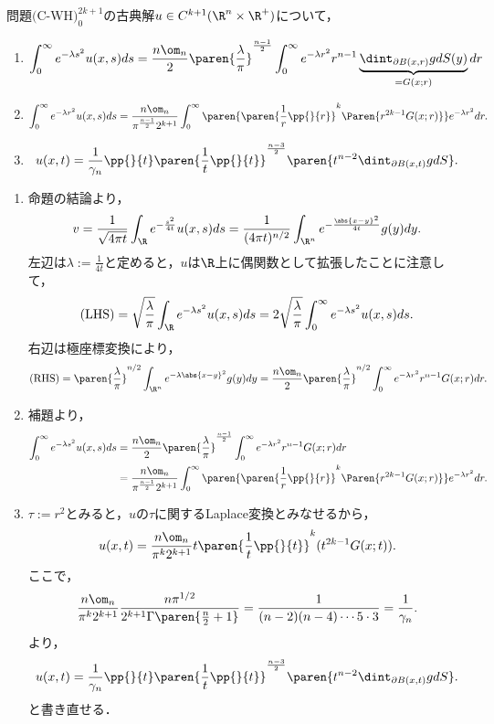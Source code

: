 \documentclass[uplatex,dvipdfmx]{jsreport}
\begin{document}
\begin{proposition}
    問題$\text{(C-WH)}^{2k+1}_0$の古典解$u\in C^{k+1}(\R^n\times\R^+)$について，
    \begin{enumerate}
        \item \[\int_0^\infty e^{-\lambda s^2}u(x,s)ds=\frac{n\om_n}{2}\paren{\frac{\lambda}{\pi}}^{\frac{n-1}{2}}\int^\infty_0e^{-\lambda r^2}r^{n-1}\underbrace{\dint_{\partial B(x,r)}gdS(y)}_{=G(x;r)}dr\]
        \item \[\int^\infty_0e^{-\lambda r^2}u(x,s)ds=\frac{n\om_n}{\pi^{\frac{n-1}{2}}2^{k+1}}\int^\infty_0\paren{\paren{\frac{1}{r}\pp{}{r}}^k\Paren{r^{2k-1}G(x;r)}}e^{-\lambda r^2}dr.\]
        \item \[u(x,t)=\frac{1}{\gamma_n}\pp{}{t}\paren{\frac{1}{t}\pp{}{t}}^{\frac{n-3}{2}}\paren{t^{n-2}\dint_{\partial B(x,t)}gdS}.\]
    \end{enumerate}
\end{proposition}
\begin{Proof}\mbox{}
    \begin{enumerate}
        \item 命題の結論より，
        \[v=\frac{1}{\sqrt{4\pi t}}\int_{\R}e^{-\frac{s^2}{4t}}u(x,s)ds=\frac{1}{(4\pi t)^{n/2}}\int_{\R^n}e^{-\frac{\abs{x-y}^2}{4t}}g(y)dy.\]
        左辺は$\lambda:=\frac{1}{4t}$と定めると，$u$は$\R$上に偶関数として拡張したことに注意して，
        \[\text{(LHS)}=\sqrt{\frac{\lambda}{\pi}}\int_\R e^{-\lambda s^2}u(x,s)ds=2\sqrt{\frac{\lambda}{\pi}}\int^\infty_0e^{-\lambda s^2}u(x,s)ds.\]
        右辺は極座標変換により，
        \[\text{(RHS)}=\paren{\frac{\lambda}{\pi}}^{n/2}\int_{\R^n}e^{-\lambda\abs{x-y}^2}g(y)dy=\frac{n\om_n}{2}\paren{\frac{\lambda}{\pi}}^{n/2}\int^\infty_0e^{-\lambda r^2}r^{n-1}G(x;r)dr.\]
        \item 補題より，
        \begin{align*}
            \int_0^\infty e^{-\lambda s^2}u(x,s)ds&=\frac{n\om_n}{2}\paren{\frac{\lambda}{\pi}}^{\frac{n-1}{2}}\int^\infty_0e^{-\lambda r^2}r^{n-1}G(x;r)dr\\
            &=\frac{n\om_n}{\pi^{\frac{n-1}{2}}2^{k+1}}\int^\infty_0\paren{\paren{\frac{1}{r}\pp{}{r}}^k\Paren{r^{2k-1}G(x;r)}}e^{-\lambda r^2}dr.
        \end{align*}
        \item $\tau:=r^2$とみると，$u$の$\tau$に関するLaplace変換とみなせるから，
        \[u(x,t)=\frac{n\om_n}{\pi^k2^{k+1}}t\paren{\frac{1}{t}\pp{}{t}}^k(t^{2k-1}G(x;t)).\]
        ここで，
        \[\frac{n\om_n}{\pi^k2^{k+1}}\frac{n\pi^{1/2}}{2^{k+1}\Gamma\paren{\frac{n}{2}+1}}=\frac{1}{(n-2)(n-4)\cdots5\cdot 3}=\frac{1}{\gamma_n}.\]
        より，
        \[u(x,t)=\frac{1}{\gamma_n}\pp{}{t}\paren{\frac{1}{t}\pp{}{t}}^{\frac{n-3}{2}}\paren{t^{n-2}\dint_{\partial B(x,t)}gdS}.\]
        と書き直せる．
    \end{enumerate}
\end{Proof}
\end{document}
